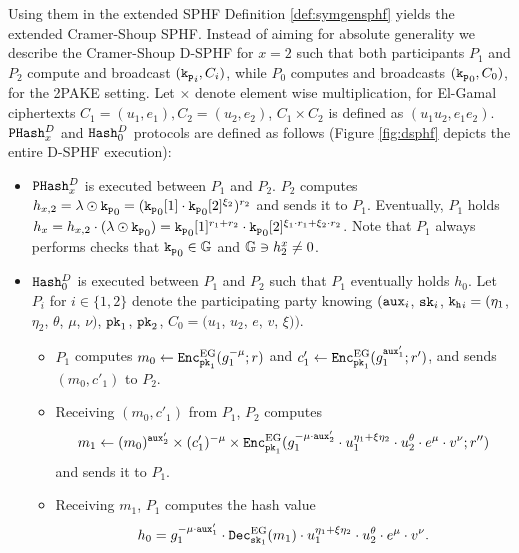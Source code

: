 \noindent
Using them in the extended \ac{SPHF} Definition \ref{def:symgensphf} yields the extended Cramer-Shoup \ac{SPHF}.
Instead of aiming for absolute generality we describe the Cramer-Shoup \ac{D-SPHF} for $x=2$ such that both participants $P_1$ and $P_2$ compute and broadcast $(\mathtt{k_p}_i,C_i)$, while $P_0$ computes and broadcasts $(\mathtt{k_p}_0,C_0)$, \ie for the \ac{2PAKE} setting.
Let $\times$ denote element wise multiplication, \eg for El-Gamal ciphertexts $C_1=(u_1,e_1), C_2=(u_2,e_2)$, $C_1\times C_2$ is defined as $(u_1u_2,e_1e_2)$.
$\mathtt{PHash}_x^D$ and $\mathtt{Hash}_0^D$ protocols are defined as follows (Figure \ref{fig:dsphf} depicts the entire \ac{D-SPHF} execution):
\begin{itemize}
	\item $\mathtt{PHash}_x^D$ is executed between $P_1$ and $P_2$.
	$P_2$ computes $h_{x,2}=\lambda\odot\mathtt{k_p}_0=(\mathtt{k_p}_0[1]\cdot \mathtt{k_p}_0[2]^{\xi_2})^{r_2}$ and sends it to $P_1$.
	Eventually, $P_1$ holds $h_x=h_{x,2}\cdot (\lambda\odot\mathtt{k_p}_0)=\mathtt{k_p}_0[1]^{r_1+r_2}\cdot \mathtt{k_p}_0[2]^{\xi_1\cdot r_1+\xi_2\cdot r_2}$.
	Note that $P_1$ always performs checks that $\mathtt{k_p}_0\in\mathbb{G}$ and $\mathbb{G}\ni h_2^x\not=0$.
	
	\item $\mathtt{Hash}_0^D$ is executed between $P_1$ and $P_2$ such that $P_1$ eventually holds $h_0$.
	Let $P_i$ for $i\in\{1,2\}$ denote the participating party knowing $(\mathtt{aux}_i$, $\mathtt{sk}_i$, $\mathtt{k_h}_i=(\eta_1$, $\eta_2$, $\theta$, $\mu$, $\nu)$, $\mathtt{pk}_1$, $\mathtt{pk}_2$, $C_0=(u_1$, $u_2$, $e$, $v$, $\xi))$.
	\begin{itemize}
		\item $P_1$ computes $m_0\gets\mathtt{Enc}_{\mathtt{pk}_1}^{\mathrm{EG}}(g_1^{-\mu};r)$ and $c'_1\gets\mathtt{Enc}_{\mathtt{pk}_1}^{\mathrm{EG}}(g_1^{\mathtt{aux}'_1};r')$, and sends $(m_0,c'_1)$ to $P_2$.
	
		\item Receiving $(m_0,c'_1)$ from $P_1$, $P_2$ computes
				$$m_1\gets (m_0)^{\mathtt{aux}'_2}\times (c'_1)^{-\mu}\times \mathtt{Enc}_{\mathtt{pk}_1}^{\mathrm{EG}}(g_{1}^{-\mu\cdot \mathtt{aux}'_2}\cdot u_1^{\eta_1+\xi\eta_2}\cdot u_2^{\theta}\cdot e^{\mu}\cdot v^{\nu};r'')$$
				and sends it to $P_1$.
	
		\item Receiving $m_1$, $P_1$ computes the hash value
				$$h_0=g_1^{-\mu\cdot\mathtt{aux}'_1}\cdot\mathtt{Dec}_{\mathtt{sk}_1}^{\mathrm{EG}}(m_1)\cdot u_1^{\eta_1+\xi\eta_2}\cdot u_2^{\theta}\cdot e^{\mu}\cdot v^{\nu}.$$
	\end{itemize}
\end{itemize}

